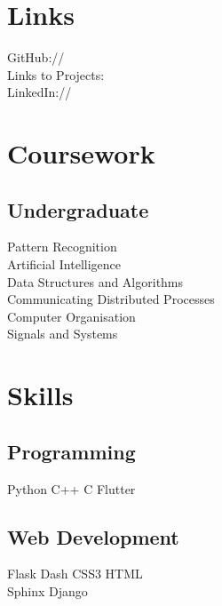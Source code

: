 \documentclass[a4paper]{deedy-resume-openfont}
\begin{document}
\begin{minipage}[t]{0.33\textwidth}

\section{Links} 
GitHub:// \href{https://github.com/shreyasbapat}{} \\
Links to Projects: \href{https://shreyasb.com/links.html}{} \\
LinkedIn://  \href{https://www.linkedin.com/in/shreyasbapat}{} \\


\section{Coursework}

\subsection{Undergraduate}
Pattern Recognition\\
Artificial Intelligence\\
Data Structures and Algorithms\\
Communicating Distributed Processes\\
Computer Organisation\\
Signals and Systems


\section{Skills}
\subsection{Programming}
Python \textbullet{}  C++ \textbullet{} C \textbullet{}
Flutter \\ 
\subsection{Web Development}
Flask \textbullet{}  Dash \textbullet{} CSS3 \textbullet{} HTML\\
Sphinx \textbullet{} Django\\

\end{minipage}
\end{document}
